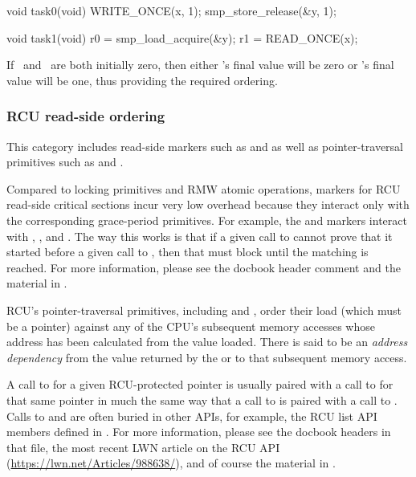 \begin{VerbatimU}
	void task0(void)
	{
		WRITE_ONCE(x, 1);
		smp_store_release(&y, 1);
	}

	void task1(void)
	{
		r0 = smp_load_acquire(&y);
		r1 = READ_ONCE(x);
	}
\end{VerbatimU}

If~ and~ are both initially zero, then either 's final
value will be zero or 's final value will be one, thus providing
the required ordering.


\subsubsection{RCU read-side ordering}

This category includes read-side markers such as 
and  as well as pointer-traversal primitives such as
 and .

Compared to locking primitives and RMW atomic operations, markers
for RCU read-side critical sections incur very low overhead because
they interact only with the corresponding grace-period primitives.
For example, the  and  markers interact
with , , and .
The way this works is that if a given call to  cannot
prove that it started before a given call to , then
that  must block until the matching 
is reached.
For more information, please see the 
docbook header comment and the material in .

RCU's pointer-traversal primitives, including  and
, order their load (which must be a pointer) against any
of the CPU's subsequent memory accesses whose address has been calculated
from the value loaded.
There is said to be an \emph{address dependency} from the value returned by
the  or  to that subsequent
memory access.

A call to  for a given RCU-protected pointer is
usually paired with a call to  for that same pointer
in much the same way that a call to  is paired with
a call to .
Calls to  and  are often
buried in other APIs, for example, the RCU list API members defined in
.
For more information, please see the docbook headers in that file, the most
recent LWN article on the RCU API (\url{https://lwn.net/Articles/988638/}),
and of course the material in .

